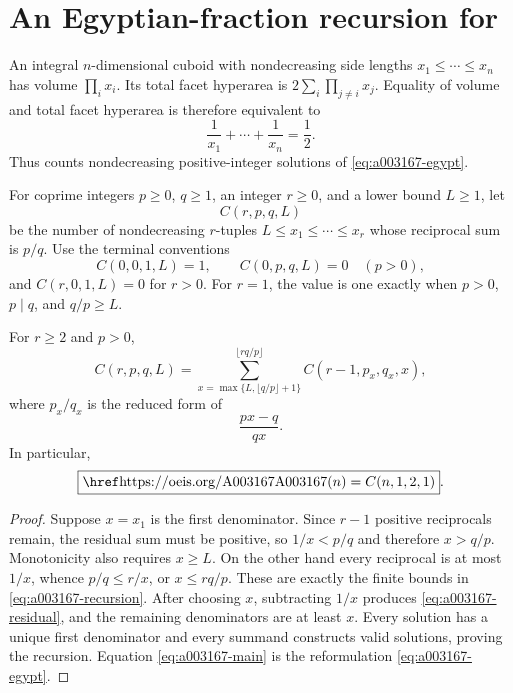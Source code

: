 \section{An Egyptian-fraction recursion for \texorpdfstring{}{A003167}}
\label{sec:a003167}

An integral \(n\)-dimensional cuboid with nondecreasing side lengths
\(x_1\le\cdots\le x_n\) has volume
\(\prod_i x_i\).  Its total facet hyperarea is
\(2\sum_i\prod_{j\ne i}x_j\).  Equality of volume and total facet hyperarea is
therefore equivalent to
\begin{equation}
 \frac1{x_1}+\cdots+\frac1{x_n}=\frac12.
 \label{eq:a003167-egypt}
\end{equation}
Thus  counts nondecreasing positive-integer solutions of
\cref{eq:a003167-egypt}.

For coprime integers \(p\ge0\), \(q\ge1\), an integer \(r\ge0\), and a lower
bound \(L\ge1\), let
\[
 C(r,p,q,L)
\]
be the number of nondecreasing \(r\)-tuples
\(L\le x_1\le\cdots\le x_r\) whose reciprocal sum is \(p/q\).
Use the terminal conventions
\[
 C(0,0,1,L)=1,
 \qquad
 C(0,p,q,L)=0\quad(p>0),
\]
and \(C(r,0,1,L)=0\) for \(r>0\).  For \(r=1\), the value is one exactly
when \(p>0\), \(p\mid q\), and \(q/p\ge L\).

\begin{theorem}
\label{thm:a003167-recursion}
For \(r\ge2\) and \(p>0\),
\begin{equation}
 C(r,p,q,L)=
 \sum_{x=\max\{L,\lfloor q/p\rfloor+1\}}^{\lfloor rq/p\rfloor}
 C(r-1,p_x,q_x,x),
 \label{eq:a003167-recursion}
\end{equation}
where \(p_x/q_x\) is the reduced form of
\begin{equation}
 \frac{px-q}{qx}.
 \label{eq:a003167-residual}
\end{equation}
In particular,
\begin{equation}
 \boxed{\seq{A003167}(n)=C(n,1,2,1)}.
 \label{eq:a003167-main}
\end{equation}
\end{theorem}

\begin{proof}
Suppose \(x=x_1\) is the first denominator.  Since \(r-1\) positive
reciprocals remain, the residual sum must be positive, so
\(1/x<p/q\) and therefore \(x>q/p\).  Monotonicity also requires \(x\ge L\).
On the other hand every reciprocal is at most \(1/x\), whence
\(p/q\le r/x\), or \(x\le rq/p\).  These are exactly the finite bounds in
\cref{eq:a003167-recursion}.  After choosing \(x\), subtracting \(1/x\)
produces \cref{eq:a003167-residual}, and the remaining denominators are at
least \(x\).  Every solution has a unique first denominator and every summand
constructs valid solutions, proving the recursion.  Equation
\cref{eq:a003167-main} is the reformulation
\cref{eq:a003167-egypt}.
\end{proof}


